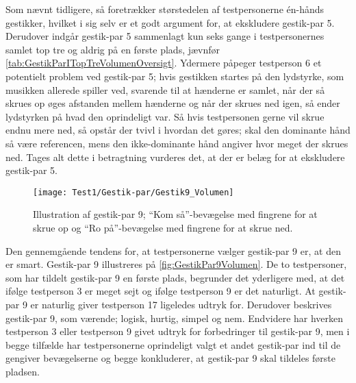 Som nævnt tidligere, så foretrækker størstedelen af testpersonerne én-hånds gestikker, hvilket i sig selv er et godt argument for, at ekskludere gestik-par 5. Derudover indgår gestik-par 5 sammenlagt kun seks gange i testpersonernes samlet top tre og aldrig på en første plads, jævnfør \autoref{tab:GestikParITopTreVolumenOversigt}. Ydermere påpeger testperson 6 et potentielt problem ved gestik-par 5; hvis gestikken startes på den lydstyrke, som musikken allerede spiller ved, svarende til at hænderne er samlet, når der så skrues op øges afstanden mellem hænderne og når der skrues ned igen, så ender lydstyrken på hvad den oprindeligt var. Så hvis testpersonen gerne vil skrue endnu mere ned, så opstår der tvivl i hvordan det gøres; skal den dominante hånd så være referencen, mens den ikke-dominante hånd angiver hvor meget der skrues ned. Tages alt dette i betragtning vurderes det, at der er belæg for at ekskludere gestik-par 5.      
%
\begin{figure}[H]
	\centering
	\texttt{[image: Test1/Gestik-par/Gestik9\_Volumen]}
	\caption{Illustration af gestik-par 9; \enquote{Kom så}-bevægelse med fingrene for at skrue op og \enquote{Ro på}-bevægelse med fingrene for at skrue ned.}
		\label{fig:GestikPar9Volumen}
\end{figure}
\noindent
%
Den gennemgående tendens for, at testpersonerne vælger gestik-par 9 er, at den er smart. Gestik-par 9 illustreres på \autoref{fig:GestikPar9Volumen}. De to testpersoner, som har tildelt gestik-par 9 en første plads, begrunder det yderligere med, at det ifølge testperson 3 er meget sejt og ifølge testperson 9 er det naturligt. At gestik-par 9 er naturlig giver testperson 17 ligeledes udtryk for. Derudover beskrives gestik-par 9, som værende; logisk, hurtig, simpel og nem. Endvidere har hverken testperson 3 eller testperson 9 givet udtryk for forbedringer til gestik-par 9, men i begge tilfælde har testpersonerne oprindeligt valgt et andet gestik-par ind til de gengiver bevægelserne og begge konkluderer, at gestik-par 9 skal tildeles første pladsen.

